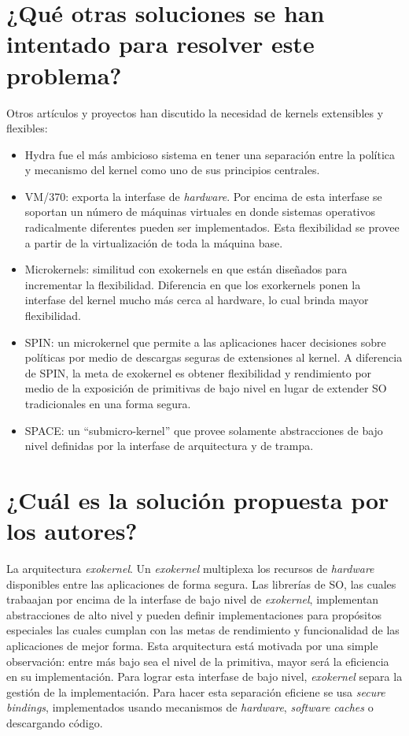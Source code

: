 \section{¿Qué otras soluciones se han intentado para resolver este problema?}
Otros artículos y proyectos han discutido la necesidad de kernels extensibles y flexibles:
\begin{itemize}
    \item Hydra fue el más ambicioso sistema en tener una separación entre la política y mecanismo del kernel como uno de sus principios centrales.
    \item VM/370: exporta la interfase de \textit{hardware}. Por encima de esta interfase se soportan un número de máquinas virtuales en donde sistemas operativos radicalmente diferentes pueden ser implementados. Esta flexibilidad se provee a partir de la virtualización de toda la máquina base.
    \item Microkernels: similitud con exokernels en que están diseñados para incrementar la flexibilidad. Diferencia en que los exorkernels ponen la interfase del kernel mucho más cerca al hardware, lo cual brinda mayor flexibilidad.
    \item SPIN: un microkernel que permite a las aplicaciones hacer decisiones sobre políticas por medio de descargas seguras de extensiones al kernel. A diferencia de SPIN, la meta de exokernel es obtener flexibilidad y rendimiento por medio de la exposición de primitivas de bajo nivel en lugar de extender SO tradicionales en una forma segura.
    \item SPACE: un ``submicro-kernel'' que provee solamente abstracciones de bajo nivel definidas por la interfase de arquitectura y de trampa. 
\end{itemize}

\section{¿Cuál es la solución propuesta por los autores?}
La arquitectura \textit{exokernel}. Un \textit{exokernel} multiplexa los recursos de \textit{hardware} disponibles entre las aplicaciones de forma segura. Las librerías de SO, las cuales trabaajan por encima de la interfase de bajo nivel de \textit{exokernel}, implementan abstracciones de alto nivel y pueden definir implementaciones para propósitos especiales las cuales cumplan con las metas de rendimiento y funcionalidad de las aplicaciones de mejor forma. Esta arquitectura está motivada por una simple observación: entre más bajo sea el nivel de la primitiva, mayor será la eficiencia en su implementación. Para lograr esta interfase de bajo nivel, \textit{exokernel} separa la gestión de la implementación. Para hacer esta separación eficiene se usa \textit{secure bindings}, implementados usando mecanismos de \textit{hardware}, \textit{software caches} o descargando código.

